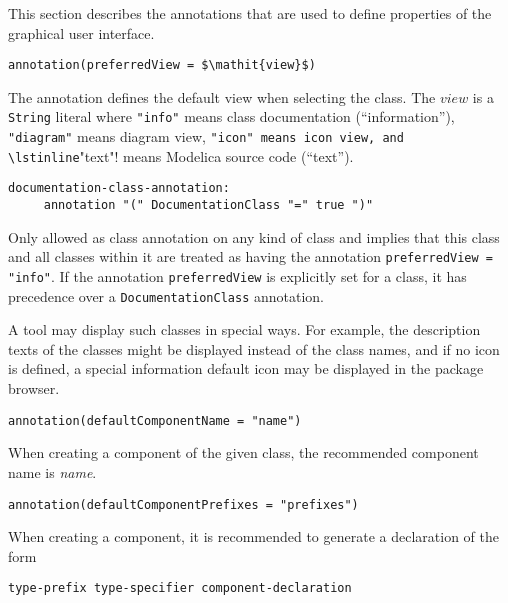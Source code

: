 This section describes the annotations that are used to define properties of the graphical user interface.

\begin{lstlisting}[language=modelica]
annotation(preferredView = $\mathit{view}$)
\end{lstlisting}

The  annotation defines the default view when selecting the class.
The $\mathit{view}$ is a \lstinline!String! literal where \lstinline!"info"! means class documentation (``information''), \lstinline!"diagram"! means diagram view, \lstinline!"icon" means icon view, and \lstinline!"text"! means Modelica source code (``text'').

\begin{lstlisting}[language=grammar]
  documentation-class-annotation:
     annotation "(" DocumentationClass "=" true ")"
\end{lstlisting}%

Only allowed as class annotation on any kind of class and implies that this class and all classes within it are treated as having the annotation \lstinline!preferredView = "info"!.
If the annotation \lstinline!preferredView! is explicitly set for a class, it has precedence over a \lstinline!DocumentationClass! annotation.

\begin{nonnormative}
A tool may display such classes in special ways.  For example, the description texts of the classes might be displayed instead
of the class names, and if no icon is defined, a special information default icon may be displayed in the package browser.
\end{nonnormative}

\begin{lstlisting}[language=modelica]
 annotation(defaultComponentName = "name")
\end{lstlisting}%

When creating a component of the given class, the recommended component name is \emph{name}.

\begin{lstlisting}[language=modelica]
annotation(defaultComponentPrefixes = "prefixes")
\end{lstlisting}%

When creating a component, it is recommended to generate a declaration of the form
\begin{lstlisting}[language=grammar]
type-prefix type-specifier component-declaration
\end{lstlisting}

